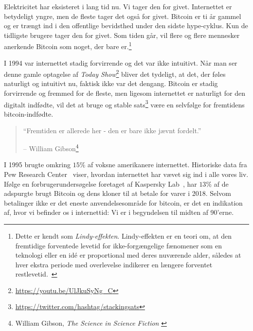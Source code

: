 \documentclass[paper=6in:9in,pagesize=pdftex,headinclude=on,footinclude=on,12pt]{scrbook}
\begin{document}
Elektricitet har eksisteret i lang tid nu. Vi tager den for givet. Internettet er betydeligt yngre, men de fleste tager det også for givet. Bitcoin er ti år gammel og er trængt ind i den offentlige bevidsthed under den sidste hype-cyklus. Kun de tidligste brugere tager den for givet. Som tiden går, vil flere og flere mennesker anerkende Bitcoin som noget, der bare er.\footnote{Dette er kendt som \textit{Lindy-effekten}. Lindy-effekten er en teori om, at den fremtidige forventede levetid for ikke-forgængelige fænomener som en teknologi eller en id\'e er proportional med deres nuværende alder, således at hver ekstra periode med overlevelse indikerer en længere forventet restlevetid.~\cite{wiki:lindy}}

I 1994 var internettet stadig forvirrende og det var ikke intuitivt. Når man ser denne gamle optagelse af \textit{Today Show}\footnote{\url{https://youtu.be/UlJkuSyNg_C}} bliver det tydeligt, at det, der føles naturligt og intuitivt nu, faktisk ikke var det dengang. Bitcoin er stadig forvirrende og fremmed for de fleste, men ligesom internettet er naturligt for den digitalt indfødte, vil det at bruge og stable sats\footnote{\url{https://twitter.com/hashtag/stackingsats}} være en selvfølge for fremtidens bitcoin-indfødte.\begin{quotation}\begin{samepage} \enquote{Fremtiden er allerede her - den er bare ikke jævnt fordelt.} \begin{flushright} -- William Gibson\footnote{William Gibson, \textit{The Science in Science Fiction} \cite{william-gibson}}
\end{flushright}\end{samepage}\end{quotation}

I 1995 brugte omkring $15\%$ af voksne amerikanere internettet. Historiske data fra Pew Research Center~\cite{pew-research} viser, hvordan internettet har vævet sig ind i alle vores liv. Ifølge en forbrugerundersøgelse foretaget af Kaspersky Lab~\cite{web:kaspersky}, har $13\%$ af de adspurgte brugt Bitcoin og dens kloner til at betale for varer i 2018. Selvom betalinger ikke er det eneste anvendelsesområde for bitcoin, er det en indikation af, hvor vi befinder os i internettid: Vi er i begyndelsen til midten af 90'erne.
\end{document}
